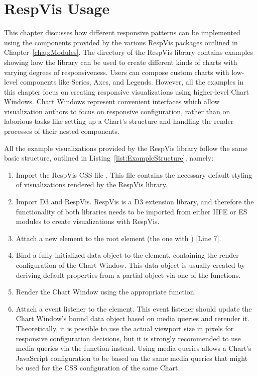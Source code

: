 \chapter{RespVis Usage}
\label{chap:Usage}

This chapter discusses how different responsive patterns can be
implemented using the components provided by the various RespVis
packages outlined in Chapter~\ref{chap:Modules}. The
 directory of the RespVis library contains examples
showing how the library can be used to create different kinds of
charts with varying degrees of responsiveness. Users can compose
custom charts with low-level components like Series, Axes, and
Legends. However, all the examples in this chapter focus on creating
responsive visualizations using higher-level Chart Windows. Chart
Windows represent convenient interfaces which allow visualization
authors to focus on responsive configuration, rather than on laborious
tasks like setting up a Chart's structure and handling the render
processes of their nested components.

All the example visualizations provided by the RespVis library follow
the same basic structure, outlined in
Listing~\ref{list:ExampleStructure}, namely:
\begin{enumerate}
\item Import the RespVis CSS file .  This file
  contains the necessary default styling of visualizations rendered by
  the RespVis library.

\item Import D3 and RespVis. RespVis is a D3 extension library, and
  therefore the functionality of both libraries needs to be imported
  from either IIFE or ES modules to create visualizations with
  RespVis.

\item Attach a new  element to the root 
  element (the one with ) [Line 7].

\item Bind a fully-initialized data object to the  element,
  containing the render configuration of the Chart Window. This data
  object is usually created by deriving default properties from a
  partial object via one of the  functions.

\item Render the Chart Window using the appropriate
   function.

\item Attach a  event listener to the 
  element. This event listener should update the Chart Window's bound
  data object based on media queries and rerender it. Theoretically,
  it is possible to use the actual viewport size in pixels for
  responsive configuration decisions, but it is strongly recommended
  to use media queries via the  function
  instead. Using media queries allows a Chart's JavaScript
  configuration to be based on the same media queries that might be
  used for the CSS configuration of the same Chart.
\end{enumerate}



